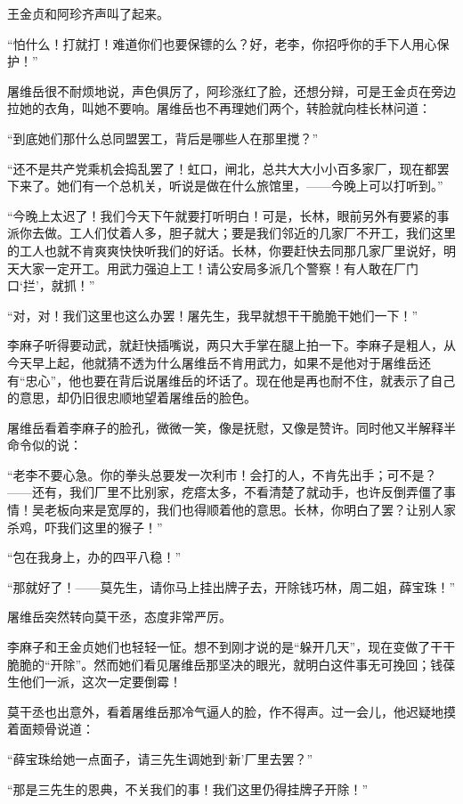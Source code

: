 \par 王金贞和阿珍齐声叫了起来。
\par “怕什么！打就打！难道你们也要保镖的么？好，老李，你招呼你的手下人用心保护！”
\par 屠维岳很不耐烦地说，声色俱厉了，阿珍涨红了脸，还想分辩，可是王金贞在旁边拉她的衣角，叫她不要响。屠维岳也不再理她们两个，转脸就向桂长林问道：
\par “到底她们那什么总同盟罢工，背后是哪些人在那里搅？”
\par “还不是共产党乘机会捣乱罢了！虹口，闸北，总共大大小小百多家厂，现在都罢下来了。她们有一个总机关，听说是做在什么旅馆里，——今晚上可以打听到。”
\par “今晚上太迟了！我们今天下午就要打听明白！可是，长林，眼前另外有要紧的事派你去做。工人们仗着人多，胆子就大；要是我们邻近的几家厂不开工，我们这里的工人也就不肯爽爽快快听我们的好话。长林，你要赶快去同那几家厂里说好，明天大家一定开工。用武力强迫上工！请公安局多派几个警察！有人敢在厂门口‘拦’，就抓！”
\par “对，对！我们这里也这么办罢！屠先生，我早就想干干脆脆干她们一下！”
\par 李麻子听得要动武，就赶快插嘴说，两只大手掌在腿上拍一下。李麻子是粗人，从今天早上起，他就猜不透为什么屠维岳不肯用武力，如果不是他对于屠维岳还有“忠心”，他也要在背后说屠维岳的坏话了。现在他是再也耐不住，就表示了自己的意思，却仍旧很忠顺地望着屠维岳的脸色。
\par 屠维岳看着李麻子的脸孔，微微一笑，像是抚慰，又像是赞许。同时他又半解释半命令似的说：
\par “老李不要心急。你的拳头总要发一次利市！会打的人，不肯先出手；可不是？——还有，我们厂里不比别家，疙瘩太多，不看清楚了就动手，也许反倒弄僵了事情！吴老板向来是宽厚的，我们也得顺着他的意思。长林，你明白了罢？让别人家杀鸡，吓我们这里的猴子！”
\par “包在我身上，办的四平八稳！”
\par “那就好了！——莫先生，请你马上挂出牌子去，开除钱巧林，周二姐，薛宝珠！”
\par 屠维岳突然转向莫干丞，态度非常严厉。
\par 李麻子和王金贞她们也轻轻一怔。想不到刚才说的是“躲开几天”，现在变做了干干脆脆的“开除”。然而她们看见屠维岳那坚决的眼光，就明白这件事无可挽回；钱葆生他们一派，这次一定要倒霉！
\par 莫干丞也出意外，看着屠维岳那冷气逼人的脸，作不得声。过一会儿，他迟疑地摸着面颊骨说道：
\par “薛宝珠给她一点面子，请三先生调她到‘新’厂里去罢？”
\par “那是三先生的恩典，不关我们的事！我们这里仍得挂牌子开除！”
